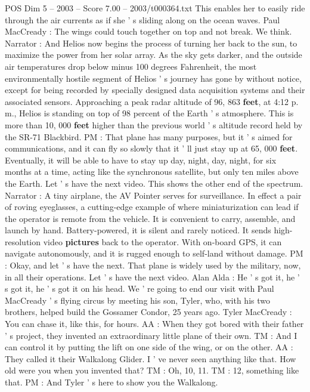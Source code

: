 \begin{textsample}{POS Dim 5 – 2003 – Score 7.00 – 2003/t000364.txt}
This enables her to easily ride through the air currents as if she ' s sliding along on the ocean waves.
Paul MacCready : The wings could touch together on top and not break.
We think.
Narrator : And Helios now begins the process of turning her back to the sun, to maximize the power from her solar array.
As the sky gets darker, and the outside air temperatures drop below minus 100 degrees Fahrenheit, the most environmentally hostile segment of Helios ' s journey has gone by without notice, except for being recorded by specially designed data acquisition systems and their associated sensors.
Approaching a peak radar altitude of 96, 863 \textbf{feet}, at 4:12 p. m., Helios is standing on top of 98 percent of the Earth ' s atmosphere.
This is more than 10, 000 \textbf{feet} higher than the previous world ' s altitude record held by the SR-71 Blackbird.
PM : That plane has many purposes, but it ' s aimed for communications, and it can fly so slowly that it ' ll just stay up at 65, 000 \textbf{feet}.
Eventually, it will be able to have to stay up day, night, day, night, for six months at a time, acting like the synchronous satellite, but only ten miles above the Earth.
Let ' s have the next video.
This shows the other end of the spectrum.
Narrator : A tiny airplane, the AV Pointer serves for surveillance.
In effect a pair of roving eyeglasses, a cutting-edge example of where miniaturization can lead if the operator is remote from the vehicle.
It is convenient to carry, assemble, and launch by hand.
Battery-powered, it is silent and rarely noticed.
It sends high-resolution video \textbf{pictures} back to the operator.
With on-board GPS, it can navigate autonomously, and it is rugged enough to self-land without damage.
PM : Okay, and let ' s have the next.
That plane is widely used by the military, now, in all their operations.
Let ' s have the next video.
Alan Alda : He ' s got it, he ' s got it, he ' s got it on his head.
We ' re going to end our visit with Paul MacCready ' s flying circus by meeting his son, Tyler, who, with his two brothers, helped build the Gossamer Condor, 25 years ago.
Tyler MacCready : You can chase it, like this, for hours.
AA : When they got bored with their father ' s project, they invented an extraordinary little plane of their own.
TM : And I can control it by putting the lift on one side of the wing, or on the other.
AA : They called it their Walkalong Glider.
I ' ve never seen anything like that.
How old were you when you invented that?
TM : Oh, 10, 11.
TM : 12, something like that.
PM : And Tyler ' s here to show you the Walkalong.

\end{textsample}
